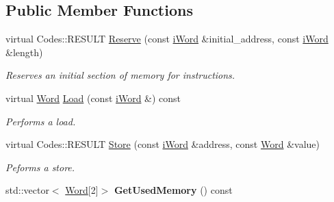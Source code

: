 \subsection*{Public Member Functions}
\begin{DoxyCompactItemize}
\item 
virtual Codes::RESULT \hyperlink{classMemory_a80cd994d4833dde66b8005184e510dda}{Reserve} (const \hyperlink{classiWord}{iWord} \&initial\_\-address, const \hyperlink{classiWord}{iWord} \&length)
\begin{DoxyCompactList}\small\item\em Reserves an initial section of memory for instructions. \item\end{DoxyCompactList}\item 
virtual \hyperlink{classWord}{Word} \hyperlink{classMemory_aca021609915080b38ca1b00d9b416e80}{Load} (const \hyperlink{classiWord}{iWord} \&) const 
\begin{DoxyCompactList}\small\item\em Performs a load. \item\end{DoxyCompactList}\item 
virtual Codes::RESULT \hyperlink{classMemory_a23703464fb24710d09be1b2010e79edc}{Store} (const \hyperlink{classiWord}{iWord} \&address, const \hyperlink{classWord}{Word} \&value)
\begin{DoxyCompactList}\small\item\em Peforms a store. \item\end{DoxyCompactList}\item 
\hypertarget{classMemory_a8a06a6f30a19b58795ab40f9f48dca4f}{
std::vector$<$ \hyperlink{classWord}{Word}\mbox{[}2\mbox{]}$>$ {\bfseries GetUsedMemory} () const }
\label{classMemory_a8a06a6f30a19b58795ab40f9f48dca4f}

\end{DoxyCompactItemize}
